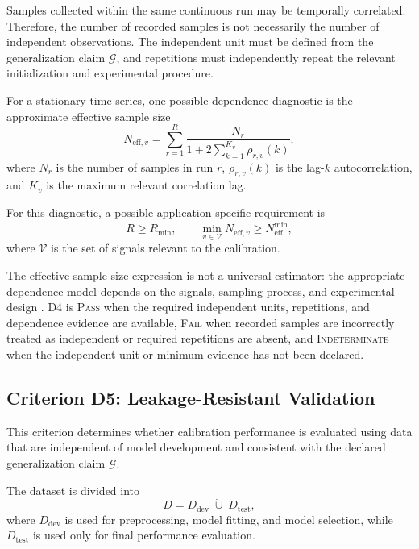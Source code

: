 \documentclass[11pt,a4paper]{article}
\begin{document}
Samples collected within the same continuous run may be temporally correlated.
Therefore, the number of recorded samples is not necessarily the number of
independent observations. The independent unit must be defined from the
generalization claim $\mathcal{G}$, and repetitions must independently repeat
the relevant initialization and experimental procedure.

For a stationary time series, one possible dependence diagnostic is the
approximate effective sample size
\begin{equation}
    N_{\mathrm{eff},v}
    =
    \sum_{r=1}^{R}
    \frac{N_r}
    {
        1
        +
        2\sum_{k=1}^{K_v}\rho_{r,v}(k)
    },
\end{equation}
where $N_r$ is the number of samples in run $r$,
$\rho_{r,v}(k)$ is the lag-$k$ autocorrelation, and $K_v$ is the maximum
relevant correlation lag.

For this diagnostic, a possible application-specific requirement is
\begin{equation}
    R\geq R_{\min},
    \qquad
    \min_{v\in\mathcal{V}}N_{\mathrm{eff},v}
    \geq
    N_{\mathrm{eff}}^{\min},
\end{equation}
where $\mathcal{V}$ is the set of signals relevant to the calibration.

The effective-sample-size expression is not a universal estimator: the
appropriate dependence model depends on the signals, sampling process, and
experimental design \cite{bayley1946}. D4 is \textsc{Pass} when the required
independent units,
repetitions, and dependence evidence are available, \textsc{Fail} when
recorded samples are incorrectly treated as independent or required
repetitions are absent, and \textsc{Indeterminate} when the independent unit or
minimum evidence has not been declared.

\subsection{Criterion D5: Leakage-Resistant Validation}

This criterion determines whether calibration performance is evaluated using
data that are independent of model development and consistent with the declared
generalization claim $\mathcal{G}$.

The dataset is divided into
\begin{equation}
    D
    =
    D_{\mathrm{dev}}
    \;\dot{\cup}\;
    D_{\mathrm{test}},
\end{equation}
where $D_{\mathrm{dev}}$ is used for preprocessing, model fitting, and model
selection, while $D_{\mathrm{test}}$ is used only for final performance
evaluation.
\end{document}
